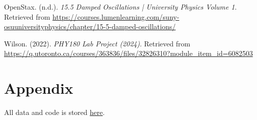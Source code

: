 \documentclass[notitlepage, twocolumn, 12pt]{article}
\begin{document}
    \onecolumn
    \begin{thebibliography}{}

    OpenStax. (n.d.). \textit{15.5 Damped Oscillations | University Physics Volume 1}. Retrieved from \url{https://courses.lumenlearning.com/suny-osuuniversityphysics/chapter/15-5-damped-oscillations/}

    Wilson. (2022). \textit{PHY180 Lab Project (2024)}. Retrieved from \url{https://q.utoronto.ca/courses/363836/files/32826310?module_item_id=6082503}

    \end{thebibliography}

    \section*{Appendix}
    All data and code is stored \href{https://github.com/PRU1/PHY180-pendulum-project}{here}.
\end{document}
